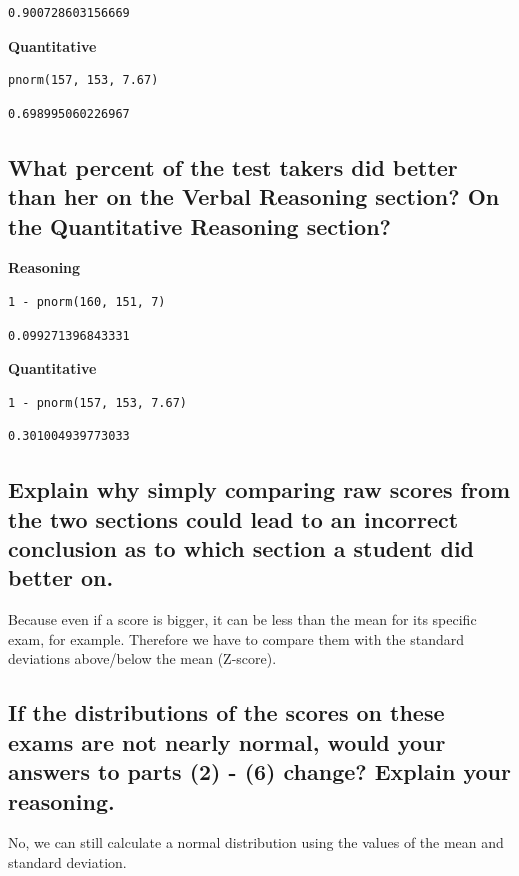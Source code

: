 \documentclass[11pt]{article}
\begin{document}
\begin{verbatim}
0.900728603156669
\end{verbatim}


\textbf{Quantitative} 
\begin{verbatim}
pnorm(157, 153, 7.67)
\end{verbatim}

\begin{verbatim}
0.698995060226967
\end{verbatim}

\subsection{What percent of the test takers did better than her on the Verbal Reasoning section? On the Quantitative Reasoning section?}
\label{sec:org671ba7d}
\textbf{Reasoning} 
\begin{verbatim}
1 - pnorm(160, 151, 7)
\end{verbatim}

\begin{verbatim}
0.099271396843331
\end{verbatim}


\textbf{Quantitative}
\begin{verbatim}
1 - pnorm(157, 153, 7.67)
\end{verbatim}

\begin{verbatim}
0.301004939773033
\end{verbatim}

\subsection{Explain why simply comparing raw scores from the two sections could lead to an incorrect conclusion as to which section a student did better on.}
\label{sec:orgd1cc826}
Because even if a score is bigger, it can be less than the mean for its specific exam, for example. Therefore we have to compare them with the standard deviations above/below the mean (Z-score).
\subsection{If the distributions of the scores on these exams are not nearly normal, would your answers to parts (2) - (6) change? Explain your reasoning.}
\label{sec:orgd8bf460}
No, we can still calculate a normal distribution using the values of the mean and standard deviation.
\end{document}
